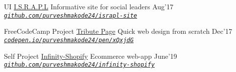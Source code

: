\begin{cventries}
  \vspace{0.5mm}
  
  \smallcventry
  {UI}
  {\href{https://github.com/PurveshMakode24/israpl-site}{I.S.R.A.P.L}}
  {Informative site for social leaders}
  {Aug'17}
  {\emph{\texttt{\href{https://github.com/purveshmakode24/israpl-site}{github.com/purveshmakode24/israpl-site}}}}
    
  \vspace{0.5mm} 

  \smallcventry
  {FreeCodeCamp Project}
  {\href{https://codepen.io/purveshmakode24/pen/xQxjdG}{Tribute Page}}
  {Quick web design from scratch}
  {Dec'17}
  {\emph{\texttt{\href{https://codepen.io/purveshmakode24/pen/xQxjdG}{codepen.io/purveshmakode24/pen/xQxjdG}}}}
  
  
  \vspace{0.5mm} 
   
  \smallcventry
  {Self Project}
  {\href{https://github.com/purveshmakode24/infinity-shopify}{Infinity-Shopify}}
  {Ecommerce web-app}
  {June'19}
  {\emph{\texttt{\href{https://github.com/purveshmakode24/infinity-shopify}{github.com/purveshmakode24/infinity-shopify}}}}
  

\end{cventries}
\vspace{-2mm}

